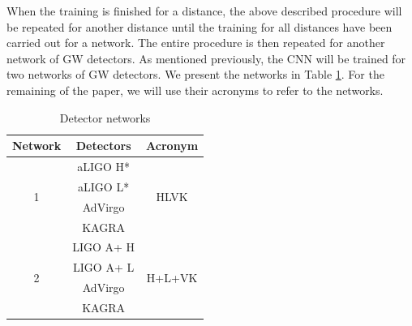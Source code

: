 \documentclass[aps,twocolumn,showpacs,groupedaddress, nofootinbib]{revtex4}  %
\begin{document}
When the training is finished for a distance, 
the above described procedure will be repeated for another distance until the training
for all distances have been carried out for a network.
The entire procedure is then repeated for another network of \ac{GW} detectors.
As mentioned previously, the \ac{CNN} will be trained for two networks of \ac{GW} detectors.
We present the networks in Table \ref{table:network}. For the remaining of the paper, we will use their acronyms to refer to the networks.
\begin{table}[]
\centering
\begin{threeparttable}
\caption{Detector networks}
\label{table:network}
\begin{tabular}{ccc}
\toprule
Network            & Detectors                & Acronym                 \\
\hline
\multirow{4}{*}{1} & \ac{aLIGO} H*    & \multirow{4}{*}{HLVK}   \\
                   & \ac{aLIGO} L* &                         \\
                   & \ac{AdVirgo}           &                         \\
                   & KAGRA                    &                         \\
                   \hline
\multirow{4}{*}{2} & LIGO A+ H          & \multirow{4}{*}{H+L+VK} \\
                   & LIGO A+ L       &                         \\
                   & \ac{AdVirgo}           &                         \\
                   & KAGRA                    &                         \\
\hline
\hline
\end{tabular}
\begin{tablenotes}
\setlength{}
\end{tablenotes}
\end{threeparttable}
\end{table}

\end{document}
